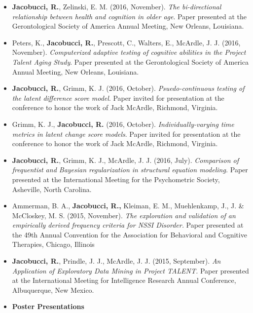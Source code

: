 \documentclass[letterpaper,10pt]{article}
\begin{document}
\begin{itemize}
\item[] \textbf{Jacobucci, R.}, Zelinski, E. M. (2016, November). \emph{The bi-directional relationship between health and cognition in older age}. Paper presented at the Gerontological Society of America Annual Meeting, New Orleans, Louisiana.

\item[] Peters, K., \textbf{Jacobucci, R.}, Prescott, C., Walters, E., McArdle, J. J. (2016, November). \emph{Computerized adaptive testing of cognitive abilities in the Project Talent Aging Study}. Paper presented at the Gerontological Society of America Annual Meeting, New Orleans, Louisiana.

\item[] \textbf{Jacobucci, R.}, Grimm, K. J. (2016, October). \emph{Psuedo-continuous testing of the latent difference score model}. Paper invited for presentation at the conference to honor the work of Jack McArdle, Richmond, Virginia.
%
\item[] Grimm, K. J., \textbf{Jacobucci, R.} (2016, October). \emph{ Individually-varying time metrics in latent change score models}. Paper invited for presentation at the conference to honor the work of Jack McArdle, Richmond, Virginia.
%

\item[] \textbf{Jacobucci, R.}, Grimm, K. J., McArdle, J. J. (2016, July). \emph{Comparison of frequentist and Bayesian regularization in structural equation modeling.} Paper presented at the International Meeting for the Psychometric Society, Asheville, North Carolina.
%
\item[]Ammerman, B. A., \textbf{Jacobucci, R.,} Kleiman, E. M., Muehlenkamp, J., J. \& McCloskey, M. S. (2015, November). \emph{The exploration and validation of an empirically derived frequency criteria for NSSI Disorder.} Paper presented at the 49th Annual Convention for the Association for Behavioral and Cognitive Therapies, Chicago, Illinois
%
\item[] \textbf{Jacobucci, R.}, Prindle, J. J., McArdle, J. J. (2015, September). \emph{An Application of Exploratory Data Mining in Project TALENT.} Paper presented at the International Meeting for Intelligence Research Annual Conference, Albuquerque, New Mexico.
%
\item {\textbf{\large{Poster Presentations}}}


\end{itemize}
\end{document}
